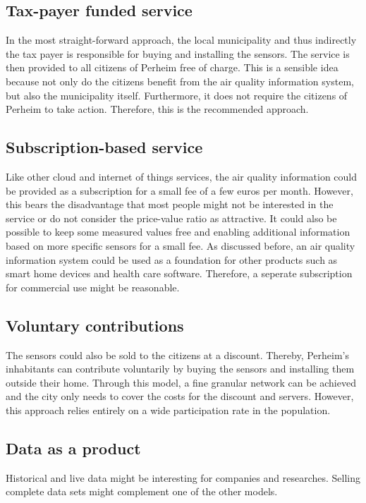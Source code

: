 \documentclass[conference]{IEEEtran}
\begin{document}
\subsection{Tax-payer funded service}
In the most straight-forward approach, the local municipality and thus indirectly the tax payer is responsible for buying and installing the sensors. The service is then provided to all citizens of Perheim free of charge. This is a sensible idea because not only do the citizens benefit from the air quality information system, but also the municipality itself. Furthermore, it does not require the citizens of Perheim to take action. Therefore, this is the recommended approach.

\subsection{Subscription-based service}
Like other cloud and internet of things services, the air quality information could be provided as a subscription for a small fee of a few euros per month. However, this bears the disadvantage that most people might not be interested in the service or do not consider the price-value ratio as attractive. It could also be possible to keep some measured values free and enabling additional information based on more specific sensors for a small fee.
As discussed before, an air quality information system could be used as a foundation for other products such as smart home devices and health care software. Therefore, a seperate subscription for commercial use might be reasonable.

\subsection{Voluntary contributions}
The sensors could also be sold to the citizens at a discount. Thereby, Perheim's inhabitants can contribute voluntarily by buying the sensors and installing them outside their home. Through this model, a fine granular network can be achieved and the city only needs to cover the costs for the discount and servers. However, this approach relies entirely on a wide participation rate in the population.

\subsection{Data as a product}
Historical and live data might be interesting for companies and researches. Selling complete data sets might complement one of the other models. 
\end{document}
